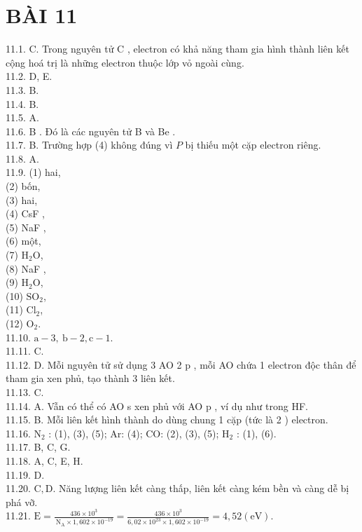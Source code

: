 \documentclass[10pt]{article}
\begin{document}
\section*{BÀI 11}
11.1. C. Trong nguyên tử C , electron có khả năng tham gia hình thành liên kết cộng hoá trị là những electron thuộc lớp vỏ ngoài cùng.\\
11.2. D, E.\\
11.3. B.\\
11.4. B.\\
11.5. A.\\
11.6. B . Đó là các nguyên tử B và Be .\\
11.7. B. Trường hợp (4) không đúng vì $P$ bị thiếu một cặp electron riêng.\\
11.8. A.\\
11.9. (1) hai,\\
(2) bốn,\\
(3) hai,\\
(4) CsF ,\\
(5) NaF ,\\
(6) một,\\
(7) $\mathrm{H}_{2} \mathrm{O}$,\\
(8) NaF ,\\
(9) $\mathrm{H}_{2} \mathrm{O}$,\\
(10) $\mathrm{SO}_{2}$,\\
(11) $\mathrm{Cl}_{2}$,\\
(12) $\mathrm{O}_{2}$.\\
11.10. $\mathrm{a}-3, \mathrm{~b}-2, \mathrm{c}-1$.\\
11.11. C.\\
11.12. D. Mỗi nguyên tử sử dụng 3 AO 2 p , mỗi AO chứa 1 electron độc thân để tham gia xen phủ, tạo thành 3 liên kết.\\
11.13. C.\\
11.14. A. Vẫn có thể có AO s xen phủ với AO p , ví dụ như trong HF.\\
11.15. B. Mỗi liên kết hình thành do dùng chung 1 cặp (tức là 2 ) electron.\\
11.16. $\mathrm{N}_{2}$ : (1), (3), (5); Ar: (4); CO: (2), (3), (5); $\mathrm{H}_{2}$ : (1), (6).\\
11.17. B, C, G.\\
11.18. A, C, E, H.\\
11.19. D.\\
11.20. $\mathrm{C}, \mathrm{D}$. Năng lượng liên kết càng thấp, liên kết càng kém bền và càng dễ bị phá vỡ.\\
11.21. $\mathrm{E}=\frac{436 \times 10^{3}}{\mathrm{~N}_{\mathrm{A}} \times 1,602 \times 10^{-19}}=\frac{436 \times 10^{3}}{6,02 \times 10^{23} \times 1,602 \times 10^{-19}}=4,52(\mathrm{eV})$.\\
\end{document}
